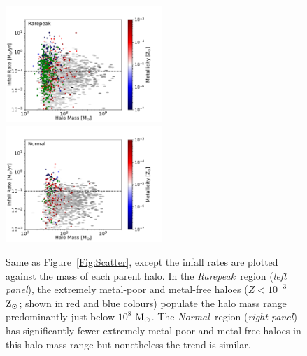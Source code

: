 \documentclass[twocolumn,iop,revtex4]{openjournal}
\newcommand{\msolarc} {$\rm{M_{\odot}}$}
\newcommand{\zsolarc} {$\rm{Z_{\odot}}$}
\newcommand{\rarepeak} {\textit{Rarepeak~}}
\newcommand{\normal} {\textit{Normal~}}
\newcommand{\void} {\textit{Void~}}
\begin{document}
\begin{figure}
\centering
\begin{minipage}{175mm}      \begin{center} 
\centerline{
\includegraphics[width=0.525\textwidth]{FIGURES/Rarepeak_MdotMHaloZ_Hexbin.pdf}
\includegraphics[width=0.525\textwidth]{FIGURES/Normal_MdotMHaloZ_Hexbin.pdf}}
\caption{Same as Figure~\ref{Fig:Scatter}, except
the infall rates are plotted against the mass of each parent halo.
In the \rarepeak region (\textit{left panel}), the extremely metal-poor
  and metal-free haloes ($Z < 10^{-3}$ \zsolarc; shown in red and blue colours) populate the halo mass range predominantly just below $10^{8}$
  \msolarc.  The \normal region (\textit{right panel})
 has significantly fewer extremely metal-poor and metal-free haloes in this halo mass range but nonetheless the trend is similar.}
\label{Fig:HaloMass}
\end{center} \end{minipage}

\end{figure}
\end{document}
